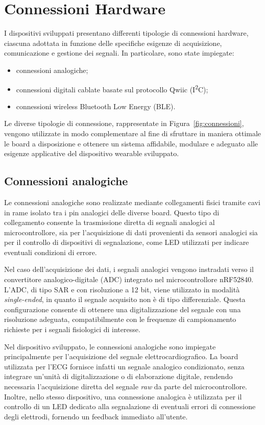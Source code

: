 \documentclass[11pt,a4paper]{article}
\begin{document}
\section{Connessioni Hardware}
I dispositivi sviluppati presentano differenti tipologie di connessioni hardware, ciascuna adottata in funzione delle specifiche esigenze di acquisizione, comunicazione e gestione dei segnali. In particolare, sono state impiegate:
\begin{itemize}
    \item connessioni analogiche;
    \item connessioni digitali cablate basate sul protocollo Qwiic (I\textsuperscript{2}C);
    \item connessioni wireless Bluetooth Low Energy (BLE).
\end{itemize}

Le diverse tipologie di connessione, rappresentate in Figura~\ref{fig:connessioni}, vengono utilizzate in modo complementare al fine di sfruttare in maniera ottimale le board a disposizione e ottenere un sistema affidabile, modulare e adeguato alle esigenze applicative del dispositivo wearable sviluppato.

\subsection{Connessioni analogiche}
Le connessioni analogiche sono realizzate mediante collegamenti fisici tramite cavi in rame isolato tra i pin analogici delle diverse board. Questo tipo di collegamento consente la trasmissione diretta di segnali analogici al microcontrollore, sia per l’acquisizione di dati provenienti da sensori analogici sia per il controllo di dispositivi di segnalazione, come LED utilizzati per indicare eventuali condizioni di errore.

Nel caso dell’acquisizione dei dati, i segnali analogici vengono instradati verso il convertitore analogico-digitale (ADC) integrato nel microcontrollore nRF52840. L’ADC, di tipo SAR e con risoluzione a 12 bit, viene utilizzato in modalità \emph{single-ended}, in quanto il segnale acquisito non è di tipo differenziale. Questa configurazione consente di ottenere una digitalizzazione del segnale con una risoluzione adeguata, compatibilmente con le frequenze di campionamento richieste per i segnali fisiologici di interesse.

Nel dispositivo sviluppato, le connessioni analogiche sono impiegate principalmente per l’acquisizione del segnale elettrocardiografico. La board utilizzata per l’ECG fornisce infatti un segnale analogico condizionato, senza integrare un’unità di digitalizzazione o di elaborazione digitale, rendendo necessaria l’acquisizione diretta del segnale \emph{raw} da parte del microcontrollore. Inoltre, nello stesso dispositivo, una connessione analogica è utilizzata per il controllo di un LED dedicato alla segnalazione di eventuali errori di connessione degli elettrodi, fornendo un feedback immediato all’utente.
\end{document}
